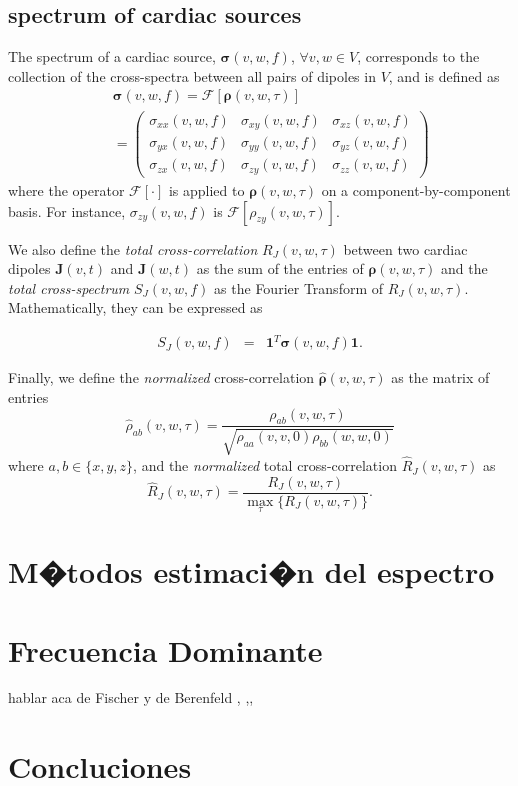 \subsection{spectrum of cardiac sources}

 
 The spectrum of a cardiac source, $\boldsymbol{\sigma}(v,w,f)$, $\forall v,w\in
 V$, corresponds to the collection of the cross-spectra between all pairs of
 dipoles in $V$, and is defined as
 \begin{eqnarray}\label{eq:spectrum_source}
 &&\boldsymbol{\sigma}(v,w,f) =\mathcal{F}[\boldsymbol{\rho}(v,w,\tau)]
 \nonumber \\
 &&=\left( \begin{array}{ccc}
 {\sigma}_{xx}(v,w, f) & {\sigma}_{xy}(v,w, f) & {\sigma}_{xz}(v,w, f) \\
 {\sigma}_{yx}(v,w, f) & {\sigma}_{yy}(v,w, f) & {\sigma}_{yz}(v,w, f) \\
 {\sigma}_{zx}(v,w, f) & {\sigma}_{zy}(v,w, f) & {\sigma}_{zz}(v,w, f)
 \end{array} \right)
 \end{eqnarray}
 where the operator $\mathcal{F}[\cdot]$ is applied to
 $\boldsymbol{\rho}(v,w,\tau)$ on a component-by-component basis. For instance,
 ${\sigma}_{zy}(v,w, f)$ is $\mathcal{F}[{\rho}_{zy}(v,w,\tau)]$. 
 
 We also define the \emph{total cross-correlation} $R_{J}(v,w,\tau)$ between two
 cardiac dipoles $\mathbf{J}(v,t)$ and $\mathbf{J}(w,t)$ as the sum of the
 entries of $\boldsymbol{\rho}(v,w,\tau)$ and the \emph{total cross-spectrum}
 $S_{J}(v,w,f)$ as the Fourier Transform of $R_{J}(v,w,\tau)$. Mathematically,
 they can be expressed as
 
 \begin{eqnarray}
 S_{J}(v,w,f)  &=&  \mathbf{1}^{T} \boldsymbol{\sigma}(v,w, f)  \mathbf{1}.
\label{total_spectrum}
\end{eqnarray}

 Finally, we define the \emph{normalized} cross-correlation
$\boldsymbol{\hat{\rho}}(v,w,\tau)$ as the matrix of entries
\begin{equation}\label{eq:normalized_autocorrelation_source}
\hat{\rho}_{ab}(v,w,\tau) = \frac{{\rho}_{ab}(v,w,\tau)}{\sqrt{{\rho}_{aa}(v,v,0){\rho}_{bb}(w,w,0)}}
\end{equation}
 where $a,b\in \{x,y,z\}$, and the \emph{normalized} total cross-correlation
$\hat{R}_{J}(v,w,\tau)$ as
\begin{equation}\label{normalized_total_corr}
\hat{R}_{J}(v,w,\tau)= \frac{R_{J}(v,w,\tau)}{{\underset{\tau}{\max}}\{R_{J}(v,w,\tau)\}}.
\end{equation}




\section{M�todos estimaci�n del espectro}
\section{Frecuencia Dominante}

hablar aca de Fischer  \cite{Fischer07} y de Berenfeld \cite{Berenfeld10},
\cite{Berenfeld11} ,\cite{Berenfeld07}, \cite{Berenfeld10}

\section{Concluciones}

 